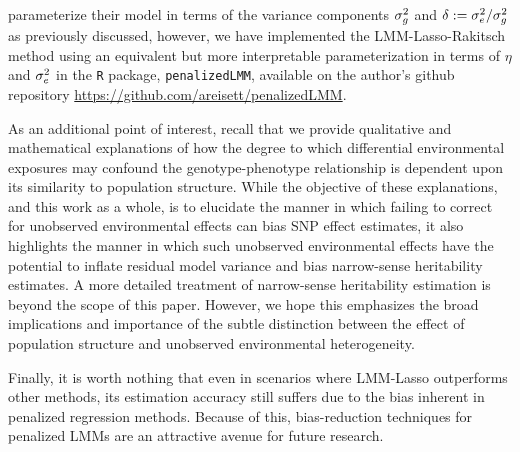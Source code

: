 \citet{Rakitsch2012} parameterize their model in terms of the variance components $\sigma^2_g$ and $\delta := \sigma^2_e / \sigma^2_g$ as previously discussed, however, we have implemented the LMM-Lasso-Rakitsch method using an equivalent but more interpretable parameterization in terms of $\eta$ and $\sigma^2_e$ in the \texttt{R} package, \texttt{penalizedLMM}, available on the author's github repository \url{https://github.com/areisett/penalizedLMM}.

As an additional point of interest, recall that we provide qualitative and mathematical explanations of how the degree to which differential environmental exposures may confound the genotype-phenotype relationship is dependent upon its similarity to population structure. While the objective of these explanations, and this work as a whole, is to elucidate the manner in which failing to correct for unobserved environmental effects can bias SNP effect estimates, it also highlights the manner in which such unobserved environmental effects have the potential to inflate residual model variance and bias narrow-sense heritability estimates. A more detailed treatment of narrow-sense heritability estimation is beyond the scope of this paper. However, we hope this emphasizes the broad implications and importance of the subtle distinction between the effect of population structure and unobserved environmental heterogeneity. 

Finally, it is worth nothing that even in scenarios where LMM-Lasso outperforms other methods, its estimation accuracy still suffers due to the bias inherent in penalized regression methods. Because of this, bias-reduction techniques for penalized LMMs are an attractive avenue for future research.




